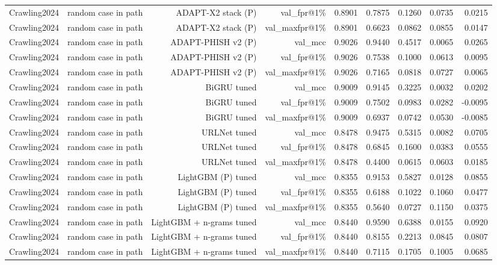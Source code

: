 \begin{table}[t]
\begin{tabular}{llrrrrrrr}
Crawling2024 & random case in path & ADAPT-X2 stack (P) & val\_fpr@1\% & 0.8901 & 0.7875 & 0.1260 & 0.0735 & 0.0215 \\
Crawling2024 & random case in path & ADAPT-X2 stack (P) & val\_maxfpr@1\% & 0.8901 & 0.6623 & 0.0862 & 0.0855 & 0.0147 \\
Crawling2024 & random case in path & ADAPT-PHISH v2 (P) & val\_mcc & 0.9026 & 0.9440 & 0.4517 & 0.0065 & 0.0265 \\
Crawling2024 & random case in path & ADAPT-PHISH v2 (P) & val\_fpr@1\% & 0.9026 & 0.7538 & 0.1000 & 0.0613 & 0.0095 \\
Crawling2024 & random case in path & ADAPT-PHISH v2 (P) & val\_maxfpr@1\% & 0.9026 & 0.7165 & 0.0818 & 0.0727 & 0.0065 \\
Crawling2024 & random case in path & BiGRU tuned & val\_mcc & 0.9009 & 0.9145 & 0.3225 & 0.0032 & 0.0202 \\
Crawling2024 & random case in path & BiGRU tuned & val\_fpr@1\% & 0.9009 & 0.7502 & 0.0983 & 0.0282 & -0.0095 \\
Crawling2024 & random case in path & BiGRU tuned & val\_maxfpr@1\% & 0.9009 & 0.6937 & 0.0742 & 0.0530 & -0.0085 \\
Crawling2024 & random case in path & URLNet tuned & val\_mcc & 0.8478 & 0.9475 & 0.5315 & 0.0082 & 0.0705 \\
Crawling2024 & random case in path & URLNet tuned & val\_fpr@1\% & 0.8478 & 0.6845 & 0.1600 & 0.0383 & 0.0555 \\
Crawling2024 & random case in path & URLNet tuned & val\_maxfpr@1\% & 0.8478 & 0.4400 & 0.0615 & 0.0603 & 0.0185 \\
Crawling2024 & random case in path & LightGBM (P) tuned & val\_mcc & 0.8355 & 0.9153 & 0.5827 & 0.0128 & 0.0855 \\
Crawling2024 & random case in path & LightGBM (P) tuned & val\_fpr@1\% & 0.8355 & 0.6188 & 0.1022 & 0.1060 & 0.0477 \\
Crawling2024 & random case in path & LightGBM (P) tuned & val\_maxfpr@1\% & 0.8355 & 0.5640 & 0.0727 & 0.1150 & 0.0375 \\
Crawling2024 & random case in path & LightGBM + n-grams tuned & val\_mcc & 0.8440 & 0.9590 & 0.6388 & 0.0155 & 0.0920 \\
Crawling2024 & random case in path & LightGBM + n-grams tuned & val\_fpr@1\% & 0.8440 & 0.8155 & 0.2213 & 0.0845 & 0.0807 \\
Crawling2024 & random case in path & LightGBM + n-grams tuned & val\_maxfpr@1\% & 0.8440 & 0.7115 & 0.1705 & 0.1005 & 0.0685 \\

\end{tabular}
\end{table}

